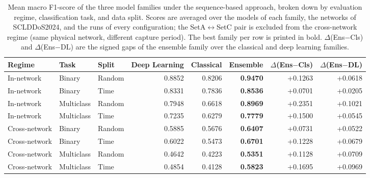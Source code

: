 \begin{table}[htbp]
\caption{Mean macro F1-score of the three model families under the sequence-based approach, broken down by evaluation regime, classification task, and data split. Scores are averaged over the models of each family, the networks of SCLDDoS2024, and the runs of every configuration; the SetA$\leftrightarrow$SetC pair is excluded from the cross-network regime (same physical network, different capture period). The best family per row is printed in bold. $\Delta$(Ens$-$Cls) and $\Delta$(Ens$-$DL) are the signed gaps of the ensemble family over the classical and deep learning families.}
\label{tab:q6_overall}
\centering
\small
\begin{tabular}{lllrrrrr}
\toprule
Regime & Task & Split & Deep Learning & Classical & Ensemble & $\Delta$(Ens$-$Cls) & $\Delta$(Ens$-$DL) \\
\midrule
In-network & Binary & Random & 0.8852 & 0.8206 & \textbf{0.9470} & +0.1263 & +0.0618 \\
In-network & Binary & Time & 0.8331 & 0.7836 & \textbf{0.8536} & +0.0701 & +0.0205 \\
In-network & Multiclass & Random & 0.7948 & 0.6618 & \textbf{0.8969} & +0.2351 & +0.1021 \\
In-network & Multiclass & Time & 0.7235 & 0.6279 & \textbf{0.7779} & +0.1500 & +0.0545 \\
\midrule
Cross-network & Binary & Random & 0.5885 & 0.5676 & \textbf{0.6407} & +0.0731 & +0.0522 \\
Cross-network & Binary & Time & 0.6022 & 0.5473 & \textbf{0.6701} & +0.1228 & +0.0679 \\
Cross-network & Multiclass & Random & 0.4642 & 0.4223 & \textbf{0.5351} & +0.1128 & +0.0709 \\
Cross-network & Multiclass & Time & 0.4854 & 0.4128 & \textbf{0.5823} & +0.1695 & +0.0969 \\
\bottomrule
\end{tabular}
\end{table}
